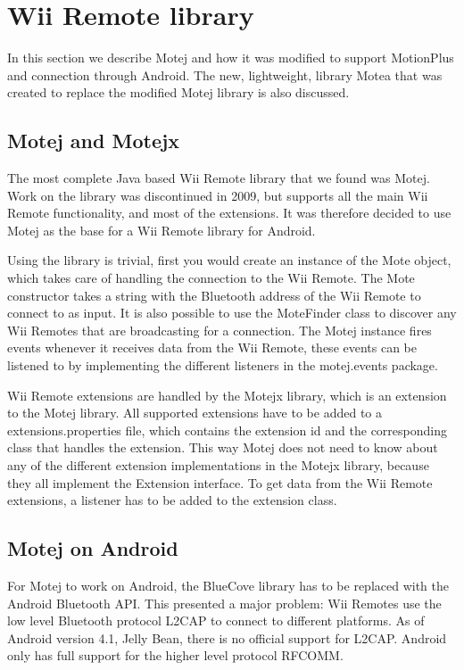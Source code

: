 \section{Wii Remote library}
In this section we describe Motej and how it was modified to support MotionPlus and connection through Android. The new, lightweight, library Motea that was created to replace the modified Motej library is also discussed.

\subsection{Motej and Motejx}
The most complete Java based Wii Remote library that we found was Motej. Work on the library was discontinued in 2009, but supports all the main Wii Remote functionality, and most of the extensions. It was therefore decided to use Motej as the base for a Wii Remote library for Android. 

Using the library is trivial, first you would create an instance of the Mote object, which takes care of handling the connection to the Wii Remote. The Mote constructor takes a string with the Bluetooth address of the Wii Remote to connect to as input. It is also possible to use the MoteFinder class to discover any Wii Remotes that are broadcasting for a connection. The Motej instance fires events whenever it receives data from the Wii Remote, these events can be listened to by implementing the different listeners in the motej.events package. 

Wii Remote extensions are handled by the Motejx library, which is an extension to the Motej library. All supported extensions have to be added to a extensions.properties file, which contains the extension id and the corresponding class that handles the extension. This way Motej does not need to know about any of the different extension implementations in the Motejx library, because they all implement the Extension interface. To get data from the Wii Remote extensions, a listener has to be added to the extension class.

\subsection{Motej on Android}
\label{sec:motejOnAndroid}
For Motej to work on Android, the BlueCove library has to be replaced with the Android Bluetooth API. This presented a major problem: Wii Remotes use the low level Bluetooth protocol L2CAP to connect to different platforms. As of Android version 4.1, Jelly Bean, \cite{jellyBean} there is no official support for L2CAP. Android only has full support for the higher level protocol RFCOMM.


